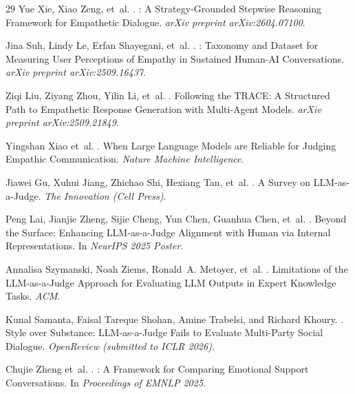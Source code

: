 \documentclass[11pt]{article}
\begin{document}
\begin{table}[t]
\begin{thebibliography}{29}
Yue Xie, Xiao Zeng, et~al.
.
: A Strategy-Grounded Stepwise Reasoning Framework for Empathetic Dialogue.
\newblock \emph{arXiv preprint arXiv:2604.07100}.

Jina Suh, Lindy Le, Erfan Shayegani, et~al.
.
: Taxonomy and Dataset for Measuring User Perceptions of Empathy in Sustained Human-{AI} Conversations.
\newblock \emph{arXiv preprint arXiv:2509.16437}.

Ziqi Liu, Ziyang Zhou, Yilin Li, et~al.
.
\newblock Following the {TRACE}: A Structured Path to Empathetic Response Generation with Multi-Agent Models.
\newblock \emph{arXiv preprint arXiv:2509.21849}.

Yingshan Xiao et~al.
.
\newblock When Large Language Models are Reliable for Judging Empathic Communication.
\newblock \emph{Nature Machine Intelligence}.

Jiawei Gu, Xuhui Jiang, Zhichao Shi, Hexiang Tan, et~al.
.
\newblock A Survey on {LLM}-as-a-Judge.
\newblock \emph{The Innovation (Cell Press)}.

Peng Lai, Jianjie Zheng, Sijie Cheng, Yun Chen, Guanhua Chen, et~al.
.
\newblock Beyond the Surface: Enhancing {LLM}-as-a-Judge Alignment with Human via Internal Representations.
\newblock In \emph{NeurIPS 2025 Poster}.

Annalisa Szymanski, Noah Ziems, Ronald~A. Metoyer, et~al.
.
\newblock Limitations of the {LLM}-as-a-Judge Approach for Evaluating {LLM} Outputs in Expert Knowledge Tasks.
\newblock \emph{ACM}.

Kunal Samanta, Faisal Tareque Shohan, Amine Trabelsi, and Richard Khoury.
.
\newblock Style over Substance: {LLM}-as-a-Judge Fails to Evaluate Multi-Party Social Dialogue.
\newblock \emph{OpenReview (submitted to ICLR 2026)}.

Chujie Zheng et~al.
.
: A Framework for Comparing Emotional Support Conversations.
\newblock In \emph{Proceedings of EMNLP 2025}.


\end{thebibliography}
\end{table}
\end{document}
